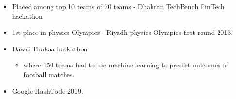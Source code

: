 \smallskip
\begin{itemize}
    \item Placed among top 10 teams of 70 teams - Dhahran TechBench FinTech hackathon
    \smallskip
    \item 1st place in physics Olympics - Riyadh physics Olympics first round 2013.
\end{itemize}

\smallskip
\begin{itemize}
    \item Dawri Thakaa hackathon
    \begin{itemize}
        \item where 150 teams had to use machine learning to predict outcomes of football matches.
    \end{itemize}
    \item Google HashCode 2019.
\end{itemize}



